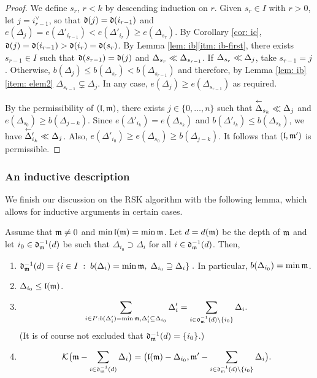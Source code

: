 \documentclass{ert-l} %
\begin{document}
\begin{proof}
We define $s_r$, $r<k$ by descending induction on $r$.
Given $s_r\in I$ with $r>0$, let $j=i_{r-1}^\vee$, so that
$\mathfrak{d}(j)=\mathfrak{d}(i_{r-1})$ and $e(\Delta_j)=e(\Delta'_{i_{r-1}})<e(\Delta'_{i_r})\ge e(\Delta_{s_r})$.
By Corollary \ref{cor: ic}, $\mathfrak{d}(j)=\mathfrak{d}(i_{r-1})>\mathfrak{d}(i_r)=\mathfrak{d}(s_r)$.
By Lemma \ref{lem: ib}\eqref{itm: ib-first}, there exists $s_{r-1}\in I$ such that $\mathfrak{d}(s_{r-1})=\mathfrak{d}(j)$ and $\Delta_{s_r}\ll\Delta_{s_{r-1}}$. If $\Delta_{s_r}\ll\Delta_j$, take $s_{r-1}=j$. Otherwise,
$b(\Delta_j)\le b(\Delta_{s_r})<b(\Delta_{s_{r-1}})$ and therefore, by Lemma \ref{lem: ib}\eqref{item: elem2} $\Delta_{s_{r-1}}\subsetneq\Delta_j$.
In any case, $e(\Delta_j)\ge e(\Delta_{s_{r-1}})$ as required.

By the permissibility of $(\mathfrak{l},\mathfrak{m})$, there exists $j\in\{0,\dots,n\}$ such that
$\lshft\Delta_{s_k}\smlr\Delta_j$ and $e(\Delta_{s_0})\ge b(\Delta_{j-k})$.
Since $e(\Delta'_{i_k})=e(\Delta_{s_k})$ and $b(\Delta'_{i_k})\le b(\Delta_{s_k})$, we have
$\lshft\Delta'_{i_k}\smlr\Delta_j$. Also,
$e(\Delta'_{i_0})\ge e(\Delta_{s_0})\ge b(\Delta_{j-k})$.
It follows that $(\mathfrak{l},\mathfrak{m}')$ is permissible.
\end{proof}

\subsubsection{An inductive description}

We finish our discussion on the RSK algorithm with the following lemma, which allows for inductive arguments in certain cases.

\begin{lemma}\label{lem: sc}
Assume that $\mathfrak{m}\ne0$ and $\min\mathfrak{l}(\mathfrak{m})=\min\mathfrak{m}$.
Let $d=d(\mathfrak{m})$ be the depth of $\mathfrak{m}$ and let $i_0\in\mathfrak{d}_{\mathfrak{m}}^{-1}(d)$ be such that
$\Delta_{i_0}\supset\Delta_i$ for all $i\in\mathfrak{d}_{\mathfrak{m}}^{-1}(d)$.
Then,
\begin{enumerate}
\item\label{it: seco} $\mathfrak{d}_{\mathfrak{m}}^{-1}(d) = \{i\in I\;:\; b(\Delta_i) = \min \mathfrak{m},\; \Delta_{i_0}\supseteq\Delta_i\}\;.$
In particular, $b(\Delta_{i_0})=\min\mathfrak{m}$.
\item $\Delta_{i_0}\le\mathfrak{l}(\mathfrak{m})$.
\item \label{part: m'e}
\[
\sum_{i\in I':b(\Delta'_i)=\min\mathfrak{m},\Delta'_i\subseteq\Delta_{i_0}}\Delta'_i=\sum_{i\in\mathfrak{d}_{\mathfrak{m}}^{-1}(d)\setminus\{i_0\}}\Delta_i.
\]
(It is of course not excluded that $\mathfrak{d}_{\mathfrak{m}}^{-1}(d)=\{i_0\}$.)
\item
\[
\mathcal{K}\big(\mathfrak{m} - \sum_{i\in\mathfrak{d}_{\mathfrak{m}}^{-1}(d)}\Delta_i\big)=
\big(\mathfrak{l}(\mathfrak{m})-\Delta_{i_0},\mathfrak{m}'-\sum_{i\in\mathfrak{d}_{\mathfrak{m}}^{-1}(d)\setminus\{i_0\}}\Delta_i\big).
\]
\end{enumerate}
\end{lemma}
\end{document}
